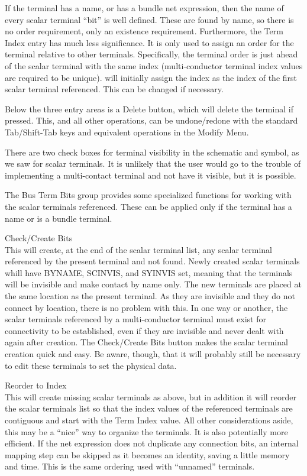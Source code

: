 If the terminal has a name, or has a bundle net expression, then the
name of every scalar terminal ``bit'' is well defined.  These are
found by name, so there is no order requirement, only an existence
requirement.  Furthermore, the {\cb Term Index} entry has much less
significance.  It is only used to assign an order for the terminal
relative to other terminals.  Specifically, the terminal order is just
ahead of the scalar terminal with the same index (multi-conductor
terminal index values are required to be unique).  {\Xic} will
initially assign the index as the index of the first scalar terminal
referenced.  This can be changed if necessary.

Below the three entry areas is a {\cb Delete} button, which will
delete the terminal if pressed.  This, and all other operations, can
be undone/redone with the standard {\Xic} {\kb Tab}/{\kb Shift-Tab}
keys and equivalent operations in the {\cb Modify Menu}.

There are two check boxes for terminal visibility in the schematic and
symbol, as we saw for scalar terminals.  It is unlikely that the user
would go to the trouble of implementing a multi-contact terminal and
not have it visible, but it is possible.

The {\cb Bus Term Bits} group provides some specialized functions for
working with the scalar terminals referenced.  These can be applied
only if the terminal has a name or is a bundle terminal.

\begin{description}
\item{\cb Check/Create Bits}\\
This will create, at the end of the scalar terminal list, any scalar
terminal referenced by the present terminal and not found.  Newly
created scalar terminals whill have {\et BYNAME}, {\et SCINVIS}, and
{\et SYINVIS} set, meaning that the terminals will be invisible and
make contact by name only.  The new terminals are placed at the same
location as the present terminal.  As they are invisible and they do
not connect by location, there is no problem with this.  In one way or
another, the scalar terminals referenced by a multi-conductor terminal
must exist for connectivity to be established, even if they are
invisible and never dealt with again after creation.  The {\cb
Check/Create Bits} button makes the scalar terminal creation quick and
easy.  Be aware, though, that it will probably still be necessary to
edit these terminals to set the physical data.

\item{\cb Reorder to Index}\\
This will create missing scalar terminals as above, but in addition it
will reorder the scalar terminals list so that the index values of the
referenced terminals are contiguous and start with the {\cb Term
Index} value.  All other considerations aside, this may be a ``nice''
way to organize the terminals.  It is also potentially more efficient. 
If the net expression does not duplicate any connection bits, an
internal mapping step can be skipped as it becomes an identity, saving
a little memory and time.  This is the same ordering used with
``unnamed'' terminals.
\end{description}

